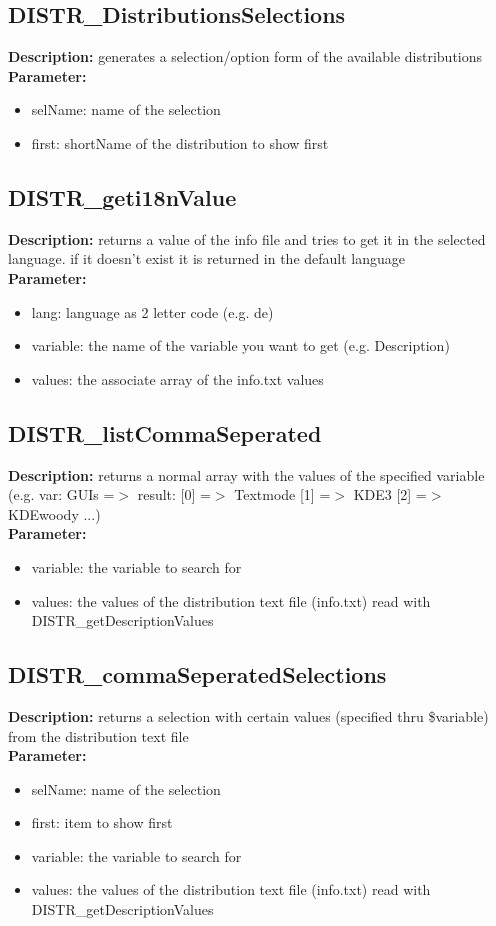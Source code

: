 \subsection{DISTR\_DistributionsSelections}
\textbf{Description:} generates a selection/option form of the available distributions\\
\textbf{Parameter:}
\begin{itemize}
\item selName: name of the selection
\item first: shortName of the distribution to show first
\end{itemize}

\subsection{DISTR\_geti18nValue}
\textbf{Description:} returns a value of the info file and tries to get it in the selected language. if it doesn't exist it is returned in the default language\\
\textbf{Parameter:}
\begin{itemize}
\item lang: language as 2 letter code (e.g. de)
\item variable: the name of the variable you want to get (e.g. Description)
\item values: the associate array of the info.txt values
\end{itemize}

\subsection{DISTR\_listCommaSeperated}
\textbf{Description:} returns a normal array with the values of the specified variable (e.g. var: GUIs =$>$ result: [0] =$>$ Textmode [1] =$>$ KDE3 [2] =$>$ KDEwoody ...)\\
\textbf{Parameter:}
\begin{itemize}
\item variable: the variable to search for
\item values: the values of the distribution text file (info.txt) read with DISTR\_getDescriptionValues
\end{itemize}

\subsection{DISTR\_commaSeperatedSelections}
\textbf{Description:} returns a selection with certain values (specified thru \$variable) from the distribution text file\\
\textbf{Parameter:}
\begin{itemize}
\item selName: name of the selection
\item first: item to show first
\item variable: the variable to search for
\item values: the values of the distribution text file (info.txt) read with DISTR\_getDescriptionValues
\end{itemize}

